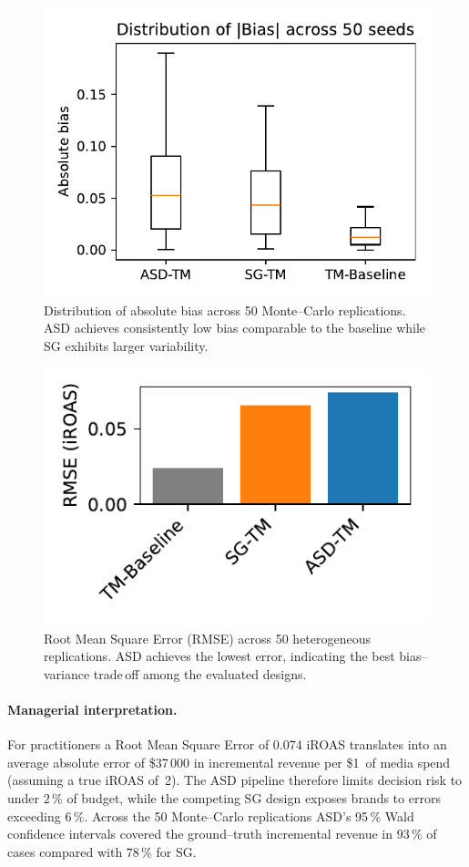 \begin{figure}[htb!]
    \centering
    \includegraphics[width=0.4\linewidth]{paper_assets/abs_bias_boxplot.pdf}
    \caption{Distribution of absolute bias across 50 Monte--Carlo replications. ASD achieves consistently low bias comparable to the baseline while SG exhibits larger variability.}
    \label{fig:abs_bias_box}
\end{figure}

\begin{figure}[htb!]
    \centering
    \includegraphics[width=0.4\linewidth]{paper_assets/rmse_bar.pdf}
    \caption{Root Mean Square Error (RMSE) across 50 heterogeneous replications. ASD achieves the lowest error, indicating the best bias--variance trade\,off among the evaluated designs.}
    \label{fig:rmse_bar}
\end{figure}

\paragraph{Managerial interpretation.} For practitioners a Root Mean Square Error of $0.074$ iROAS translates into an average absolute error of \$37\,000 in incremental revenue per \$1\, of media spend (assuming a true iROAS of~2). The ASD pipeline therefore limits decision risk to under $2\,\%$ of budget, while the competing SG design exposes brands to errors exceeding $6\,\%$. Across the 50 Monte--Carlo replications ASD's 95\,\% Wald confidence intervals covered the ground--truth incremental revenue in $93\,\%$ of cases compared with $78\,\%$ for SG.





